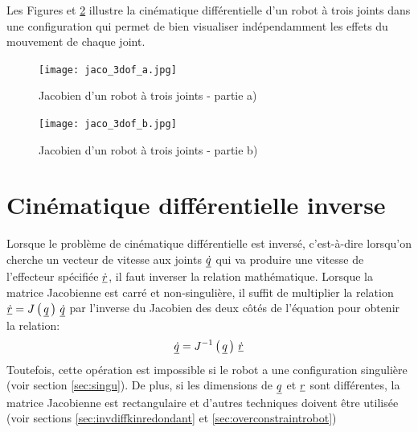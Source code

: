 


\begin{example}
\label{sec:diffkinrobot3dofex}

Les Figures \pageref{fig:jaco_3dof_a} et \ref{fig:jaco_3dof_b} illustre la cinématique différentielle d'un robot à trois joints dans une configuration qui permet de bien visualiser indépendamment les effets du mouvement de chaque joint. 

\begin{figure}[H]
	\centering
		\texttt{[image: jaco\_3dof\_a.jpg]}
	\caption{Jacobien d'un robot à trois joints - partie a)}
	\label{fig:jaco_3dof_a}
\end{figure}

\begin{figure}[H]
	\centering
		\texttt{[image: jaco\_3dof\_b.jpg]}
	\caption{Jacobien d'un robot à trois joints - partie b)}
	\label{fig:jaco_3dof_b}
\end{figure}
\end{example}


\newpage
\section{Cinématique différentielle inverse}

Lorsque le problème de cinématique différentielle est inversé, c'est-à-dire lorsqu'on cherche un vecteur de vitesse aux joints $\underline{\dot{q}}$ qui va produire une vitesse de l'effecteur spécifiée $\underline{\dot{r}}$, il faut inverser la relation mathématique. Lorsque la matrice Jacobienne est carré et non-singulière, il suffit de multiplier la relation $\underline{\dot{r}} = J\left( \, \underline{q} \, \right) \, \underline{\dot{q}}$ par l'inverse du Jacobien des deux côtés de l'équation pour obtenir la relation:
%
\begin{align}
\underline{\dot{q}} = J^{-1}\left( \, \underline{q} \, \right) \, \underline{\dot{r}}
\end{align} 
%
Toutefois, cette opération est impossible si le robot a une configuration singulière (voir section \ref{sec:singu}). De plus, si les dimensions de $\underline{q}$ et $\underline{r}$ sont différentes, la matrice Jacobienne est rectangulaire et d'autres techniques doivent être utilisée (voir sections \ref{sec:invdiffkinredondant} et \ref{sec:overconstraintrobot})

